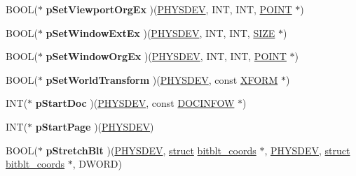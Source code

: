 \begin{DoxyCompactItemize}
\mbox{\label{structgdi__dc__funcs_abb7393c79175b0f4d45052c31041a549}} 
B\+O\+OL($\ast$ {\bfseries p\+Set\+Viewport\+Org\+Ex} )(\hyperlink{structgdi__physdev}{P\+H\+Y\+S\+D\+EV}, I\+NT, I\+NT, \hyperlink{structtag_p_o_i_n_t}{P\+O\+I\+NT} $\ast$)
\item 
\mbox{\label{structgdi__dc__funcs_a7818d0260996d642c18be6b49676176f}} 
B\+O\+OL($\ast$ {\bfseries p\+Set\+Window\+Ext\+Ex} )(\hyperlink{structgdi__physdev}{P\+H\+Y\+S\+D\+EV}, I\+NT, I\+NT, \hyperlink{structtag_s_i_z_e}{S\+I\+ZE} $\ast$)
\item 
\mbox{\label{structgdi__dc__funcs_a7e1a34f105e5cd20cf0fc8bbff9be7c6}} 
B\+O\+OL($\ast$ {\bfseries p\+Set\+Window\+Org\+Ex} )(\hyperlink{structgdi__physdev}{P\+H\+Y\+S\+D\+EV}, I\+NT, I\+NT, \hyperlink{structtag_p_o_i_n_t}{P\+O\+I\+NT} $\ast$)
\item 
\mbox{\label{structgdi__dc__funcs_a66475c7364409806b94770e70018832b}} 
B\+O\+OL($\ast$ {\bfseries p\+Set\+World\+Transform} )(\hyperlink{structgdi__physdev}{P\+H\+Y\+S\+D\+EV}, const \hyperlink{struct___x_f_o_r_m}{X\+F\+O\+RM} $\ast$)
\item 
\mbox{\label{structgdi__dc__funcs_a8bf7cc9113aec6e169bec869b5386c1a}} 
I\+NT($\ast$ {\bfseries p\+Start\+Doc} )(\hyperlink{structgdi__physdev}{P\+H\+Y\+S\+D\+EV}, const \hyperlink{struct___d_o_c_i_n_f_o_w}{D\+O\+C\+I\+N\+F\+OW} $\ast$)
\item 
\mbox{\label{structgdi__dc__funcs_a17e3e35c871bb6732c3b3b3157ff4d24}} 
I\+NT($\ast$ {\bfseries p\+Start\+Page} )(\hyperlink{structgdi__physdev}{P\+H\+Y\+S\+D\+EV})
\item 
\mbox{\label{structgdi__dc__funcs_a37bdaeba32356e3d257aeda00c5392ba}} 
B\+O\+OL($\ast$ {\bfseries p\+Stretch\+Blt} )(\hyperlink{structgdi__physdev}{P\+H\+Y\+S\+D\+EV}, \hyperlink{interfacestruct}{struct} \hyperlink{structbitblt__coords}{bitblt\+\_\+coords} $\ast$, \hyperlink{structgdi__physdev}{P\+H\+Y\+S\+D\+EV}, \hyperlink{interfacestruct}{struct} \hyperlink{structbitblt__coords}{bitblt\+\_\+coords} $\ast$, D\+W\+O\+RD)
\item 
\mbox{\label{structgdi__dc__funcs_a96b48057173a3fdf1ef282d22304b2d1}} 

\end{DoxyCompactItemize}
